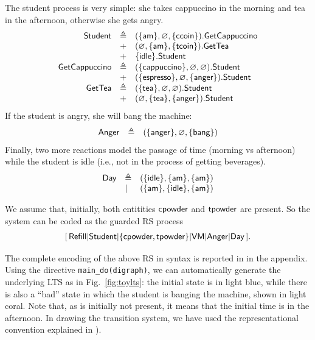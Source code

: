 The student process is very simple: she takes cappuccino in the morning and tea in the afternoon, otherwise she gets angry.
\[
\begin{array}{rll}
\mathsf{Student} & \triangleq & (\{{\text{\sffamily am}}\},\varnothing,\{{\text{\sffamily ccoin}}\}).\mathsf{GetCappuccino}\\
& + & (\varnothing,\{{\text{\sffamily am}}\},\{{\text{\sffamily tcoin}}\}).\mathsf{GetTea}\\
& + & \{{\text{\sffamily idle}}\}.\mathsf{Student}\\
\mathsf{GetCappuccino} & \triangleq & (\{{\text{\sffamily cappuccino}}\},\varnothing,\varnothing).\mathsf{Student}\\
& + & (\{{\text{\sffamily espresso}}\},\varnothing,\{{\text{\sffamily anger}}\}).\mathsf{Student}\\
\mathsf{GetTea} & \triangleq & (\{{\text{\sffamily tea}}\},\varnothing,\varnothing).\mathsf{Student}\\
& + & (\varnothing,\{{\text{\sffamily tea}}\},\{{\text{\sffamily anger}}\}).\mathsf{Student}\\
\end{array}
\]
If the student is angry, she will bang the machine:
\[
\begin{array}{lll}
\mathsf{Anger} & \triangleq & (\{{\text{\sffamily anger}}\},\varnothing,\{{\text{\sffamily bang}}\})
\end{array}
\]
Finally, two more reactions model the passage of time (morning vs afternoon) while the student is idle (i.e., not in the process of getting beverages).
\[
\begin{array}{lll}
\mathsf{Day} & \triangleq & (\{{\text{\sffamily idle}}\},\{{\text{\sffamily am}}\},\{{\text{\sffamily am}}\})\\
& | & (\{{\text{\sffamily am}}\},\{{\text{\sffamily idle}}\},\{{\text{\sffamily am}}\})
\end{array}
\]

We assume that, initially, both entitities ${\text{\sffamily cpowder}}$ and ${\text{\sffamily tpowder}}$ are present.
So the system can be coded as the guarded RS process
\[
[\,\mathsf{Refill}
| \mathsf{Student}
| \{{\text{\sffamily cpowder}},{\text{\sffamily tpowder}}\} 
| \mathsf{VM}
| \mathsf{Anger}
| \mathsf{Day}\,] .
\]

The complete encoding of the above RS in \BioResolve syntax is reported in  in the appendix.
Using the \BioResolve directive \verb=main_do(digraph)=, we can automatically generate the underlying LTS as in Fig.~\ref{fig:toylts}: the initial state is in light blue, while there is also a ``bad'' state in which the student is banging the machine, shown in light coral.
Note that, as \am is initially not present, it means that the initial time is in the afternoon. In drawing the transition system, we have used the representational convention explained in ).

